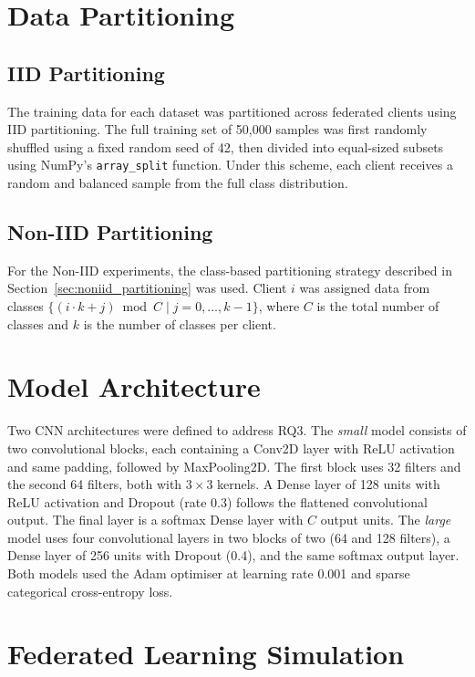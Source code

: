 \documentclass[12pt, a4paper]{report}
\begin{document}
\section{Data Partitioning}

\subsection{IID Partitioning}
The training data for each dataset was partitioned across federated clients using
IID partitioning. The full training set of 50,000 samples was first randomly
shuffled using a fixed random seed of 42, then divided into equal-sized subsets
using NumPy's \texttt{array\_split} function. Under this scheme, each client
receives a random and balanced sample from the full class distribution.

\subsection{Non-IID Partitioning}
For the Non-IID experiments, the class-based partitioning strategy described in
Section~\ref{sec:noniid_partitioning} was used. Client $i$ was assigned data
from classes $\{(i \cdot k + j) \bmod C \mid j = 0, \ldots, k-1\}$, where $C$
is the total number of classes and $k$ is the number of classes per client.

\section{Model Architecture}

Two CNN architectures were defined to address RQ3. The \textit{small} model
consists of two convolutional blocks, each containing a Conv2D layer with ReLU
activation and same padding, followed by MaxPooling2D. The first block uses 32
filters and the second 64 filters, both with $3 \times 3$ kernels. A Dense layer
of 128 units with ReLU activation and Dropout (rate 0.3) follows the flattened
convolutional output. The final layer is a softmax Dense layer with $C$ output
units. The \textit{large} model uses four convolutional layers in two blocks of
two (64 and 128 filters), a Dense layer of 256 units with Dropout (0.4), and the
same softmax output layer. Both models used the Adam optimiser at learning rate
0.001 and sparse categorical cross-entropy loss.

\section{Federated Learning Simulation}
\end{document}
